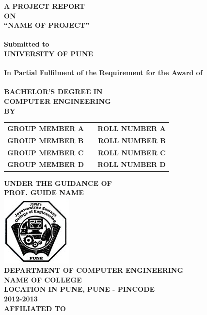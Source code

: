 \newpage
\begin{center}
\thispagestyle{empty}
\Large{\textbf{A PROJECT REPORT\\ON}}\\[0.3cm]
\Large{\textsc {\textbf{``NAME OF PROJECT''}}}\\
\Large{\textbf{\\Submitted to}}
\LARGE{\textbf{\\UNIVERSITY OF PUNE\\}}
\large{\textbf{\\In Partial Fulfilment of the Requirement for the Award of\\}}
\LARGE{\textbf{\\BACHELOR'S DEGREE IN\\COMPUTER ENGINEERING}}
\vspace{0.3cm}
\Large{\textbf{\\BY}}\\[0.3cm]
\begin{table}[h]
\centering
\Large{
\begin{tabular}{>{\bfseries}lc>{\bfseries}r}
GROUP MEMBER A & & ROLL NUMBER A\\GROUP MEMBER B & & ROLL NUMBER B\\GROUP MEMBER C & & ROLL NUMBER C\\GROUP MEMBER D & & ROLL NUMBER D\\
\end{tabular}}
\end{table}
\large{\textbf{UNDER THE GUIDANCE OF}}\\
\large{\textbf{PROF. GUIDE NAME}}\\[0.5cm]
\includegraphics[scale=0.5]{project/images/jscoe_logo}\\
\large{\textbf{DEPARTMENT OF COMPUTER ENGINEERING}}\\
\Large{\textbf{NAME OF COLLEGE}}\\
\large{\textbf{LOCATION IN PUNE, PUNE - PINCODE}}
\large{\textbf{\\2012-2013}}\\[0.5cm]
\Large{\textbf{AFFILIATED TO}}\\[0.5cm]

\end{center}
